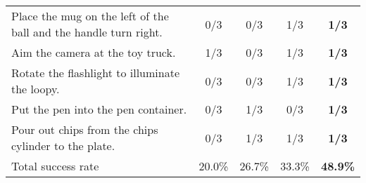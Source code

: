 \begin{table*}[t!]
{\begin{tabular}{lcccc}
    Place the mug on the left of the ball and the handle turn right. & 0/3 & 0/3 & 1/3 & \textbf{1/3}\\
    Aim the camera at the toy truck. & 1/3 & 0/3 & 1/3 & \textbf{1/3}\\
    Rotate the flashlight to illuminate the loopy. & 0/3 & 0/3 & 1/3 & \textbf{1/3}\\
    Put the pen into the pen container. & 0/3 & 1/3 & 0/3 & \textbf{1/3} \\
    Pour out chips from the chips cylinder to the plate. & 0/3 & 1/3 & 1/3 & \textbf{1/3} \\
    Total success rate& 20.0\% & 26.7\% & 33.3\% & \textbf{48.9\%} \\
    \bottomrule[0.95pt]
\end{tabular}
}
\end{table*}
\vspace{-10pt}